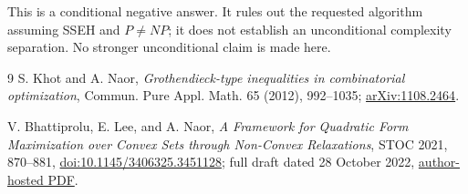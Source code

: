 \documentclass[10pt]{article}
\begin{document}
This is a conditional negative answer.  It rules out the requested algorithm
assuming SSEH and $P\neq NP$; it does not establish an unconditional
complexity separation.  No stronger unconditional claim is made here.

\begin{thebibliography}{9}
S. Khot and A. Naor,
\emph{Grothendieck-type inequalities in combinatorial optimization},
Commun. Pure Appl. Math. 65 (2012), 992--1035;
\href{https://arxiv.org/abs/1108.2464}{arXiv:1108.2464}.

V. Bhattiprolu, E. Lee, and A. Naor,
\emph{A Framework for Quadratic Form Maximization over Convex Sets through
Non-Convex Relaxations}, STOC 2021, 870--881,
\href{https://doi.org/10.1145/3406325.3451128}{doi:10.1145/3406325.3451128};
full draft dated 28 October 2022,
\href{https://www.math.uwaterloo.ca/~vbhattip/quadmax.pdf}{author-hosted PDF}.
\end{thebibliography}
\end{document}

